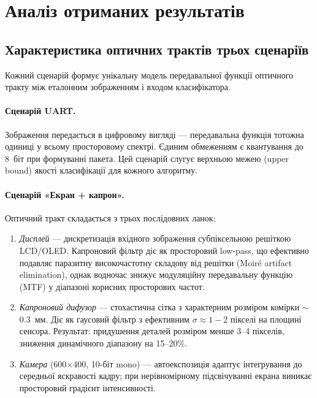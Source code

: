 \documentclass[a4paper,12pt]{article}
\let\oldsection\section
\renewcommand{\section}{\clearpage\oldsection}
\begin{document}
\section{Аналіз отриманих результатів}

\subsection{Характеристика оптичних трактів трьох сценаріїв}

Кожний сценарій формує унікальну модель передавальної функції оптичного тракту між еталонним зображенням і входом класифікатора.

\paragraph{Сценарій UART.} Зображення передається в цифровому вигляді --- передавальна функція тотожна одиниці у всьому просторовому спектрі. Єдиним обмеженням є квантування до 8~біт при формуванні пакета. Цей сценарій слугує верхньою межею (upper bound) якості класифікації для кожного алгоритму.

\paragraph{Сценарій «Екран + капрон».} Оптичний тракт складається з трьох послідовних ланок:
\begin{enumerate}
	\item \textit{Дисплей} --- дискретизація вхідного зображення субпіксельною решіткою LCD/OLED. Капроновий фільтр діє як просторовий low-pass, що ефективно подавляє паразитну високочастотну складову від решітки (Moiré artifact elimination), однак водночас знижує модуляційну передавальну функцію (MTF) у діапазоні корисних просторових частот.
	\item \textit{Капроновий дифузор} --- стохастична сітка з характерним розміром комірки $\sim$0.3~мм. Діє як гаусовий фільтр з ефективним $\sigma\approx 1{-}2$ пікселі на площині сенсора. Результат: придушення деталей розміром менше 3--4 пікселів, зниження динамічного діапазону на 15--20\%.
	\item \textit{Камера} (600$\times$400, 10-біт mono) --- автоекспозиція адаптує інтегрування до середньої яскравості кадру; при нерівномірному підсвічуванні екрана виникає просторовий градієнт інтенсивності.
\end{enumerate}
\end{document}
